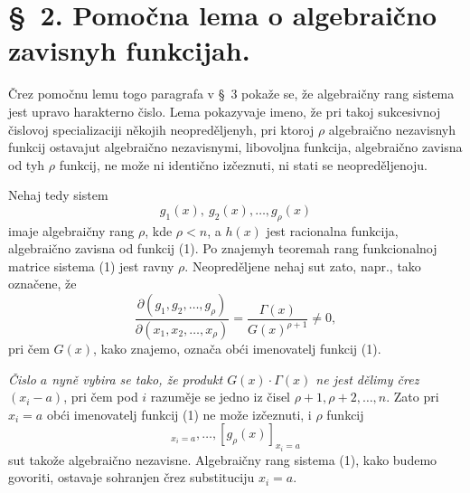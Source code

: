 \documentclass[11pt]{article}
\begin{document}
\section*{\S\ 2. Pomočna lema o algebraično zavisnyh funkcijah.}

Črez pomočnu lemu togo paragrafa v \S\ 3 pokaže se, že algebraičny rang sistema jest upravo harakterno čislo. Lema pokazyvaje imeno, že pri takoj sukcesivnoj čislovoj specializaciji někojih neopreděljenyh, pri ktoroj $\rho$ algebraično nezavisnyh funkcij ostavajut algebraično nezavisnymi, libovoljna funkcija, algebraično zavisna od tyh $\rho$ funkcij, ne može ni identično izčeznuti, ni stati se neopreděljenoju.

Nehaj tedy sistem
\begin{equation}
  g_1(x),\ g_2(x),\ldots,g_\rho(x)
\tag{1}
\end{equation}
imaje algebraičny rang $\rho$, kde $\rho<n$, a $h(x)$ jest racionalna funkcija, algebraično zavisna od funkcij (1). Po znajemyh teoremah rang funkcionalnoj matrice sistema (1) jest ravny $\rho$. Neopreděljene nehaj sut zato, napr., tako označene, že
\begin{equation}
 \frac{\partial(g_1,g_2,\ldots,g_\rho)}{\partial(x_1,x_2,\ldots,x_\rho)}
 =\frac{\Gamma(x)}{G(x)^{\rho+1}}\ne0,
\tag{2}
\end{equation}
pri čem $G(x)$, kako znajemo, označa obći imenovatelj funkcij (1).

{\itshape Čislo $a$ nyně vybira se tako, že produkt $G(x)\cdot\Gamma(x)$ ne jest dělimy črez $(x_i-a)$}, pri čem pod $i$ razuměje se jedno iz čisel $\rho+1,\rho+2,\ldots,n$. Zato pri $x_i=a$ obći imenovatelj funkcij (1) ne može izčeznuti, i $\rho$ funkcij
\begin{equation}
  [g_1(x)]_{x_i=a},\ldots,[g_\rho(x)]_{x_i=a}
\tag{3}
\end{equation}
sut takože algebraično nezavisne. Algebraičny rang sistema (1), kako budemo govoriti, ostavaje sohranjen črez substituciju $x_i=a$.
\end{document}
